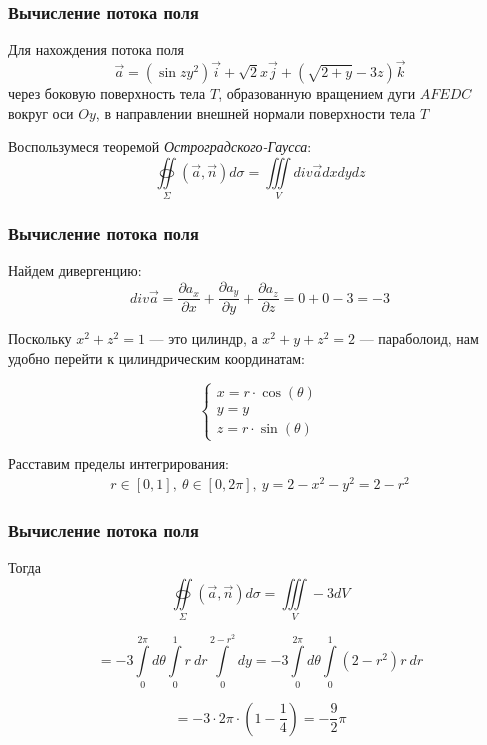 \begin{frame}\frametitle{Вычисление потока поля}
  Для нахождения потока поля
  \begin{equation*}
		\vec a = (\sin zy^2) \vec i + \sqrt{2} x \vec j + (\sqrt{2+y} -3z) \vec k
	\end{equation*}
		      через боковую поверхность тела \(T\), образованную вращением дуги \(AFEDC\)
		      вокруг оси \(Oy\), в направлении внешней нормали поверхности тела \(T\)
 

  Воспользумеся теоремой \textit{Остроградского-Гаусса}:
  \begin{equation*}
    \oiint\limits_{\Sigma}\left( \vec {a}, \vec {n} \right) d\sigma = \iiint\limits_V div \vec {a} dxdydz 
  \end{equation*}
\end{frame}


\begin{frame}\frametitle{Вычисление потока поля}
  Найдем дивергенцию:
  \begin{equation*}
    div \vec a = \frac{\partial a_x}{\partial x} +  \frac{\partial a_y}{\partial y} +  \frac{\partial a_z}{\partial z} = 0 + 0 - 3 = -3 
	\end{equation*}

  Поскольку $x^2 + z^2 = 1$ — это цилиндр, а $x^2 + y + z^2 = 2$ — параболоид, нам удобно перейти к цилиндрическим координатам:

  \begin{equation*}
    \begin{cases}
      x = r \cdot \cos(\theta) \\
      y = y \\
      z = r \cdot \sin(\theta)
    \end{cases}
  \end{equation*}

  Расставим пределы интегрирования:
  \begin{align*}
    r \in [0, 1], \
    \theta \in [0, 2\pi], \ 
    y = 2 - x^2 - y^2 = 2 - r^2
  \end{align*}
  \end{frame}

\begin{frame}\frametitle{Вычисление потока поля} 

Тогда
  \begin{equation*}
    \oiint\limits_{\Sigma}\left( \vec {a}, \vec {n} \right) d\sigma = \iiint\limits_V -3 dV
  \end{equation*}
  
  \begin{equation*}
    = -3 \int\limits_{0}^{2 \pi} d \theta
    \int\limits_{0}^{1} r~dr 
    \int\limits_{0}^{2-r^2} dy 
    = -3 \int\limits_{0}^{2 \pi} d \theta
    \int\limits_{0}^{1} (2-r^2)r~dr 
  \end{equation*}
 
  \begin{equation*}
    = -3 \cdot 2 \pi \cdot
    (1 - \frac{1}{4})
    = - \frac{9}{2}\pi
  \end{equation*}
\end{frame}
